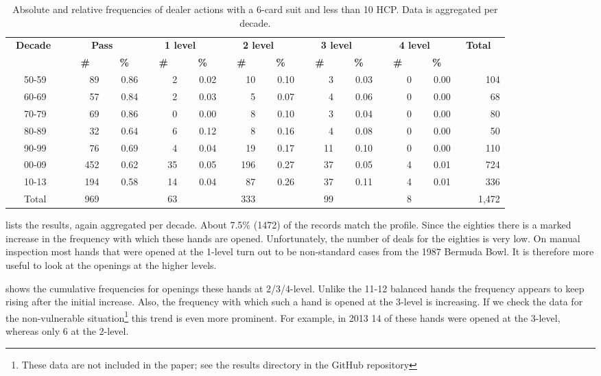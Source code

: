 \documentclass{llncs}
\begin{document}
\begin{table}
\caption{Absolute and relative frequencies of dealer actions with a
  6-card suit and less than 10 HCP. Data is aggregated per decade.}
\label{tbl:weak-two-1st}
\centering\footnotesize
\begin{tabular}{|c|r|r|r|r|r|r|r|r|r|r|r|}
\hline
\bf \ Decade \ & 
\multicolumn{2}{|c|}{\bf \ Pass \ }  &
\multicolumn{2}{|c|}{\bf \ 1 level \ } &
\multicolumn{2}{|c|}{\bf \ 2 level \ } &
\multicolumn{2}{|c|}{\bf \ 3 level \ } &
\multicolumn{2}{|c|}{\bf \ 4 level \ } &
\bf \ Total \  \\ 
\cline{2-11} &
\bf \ \ \# \ &\bf \ \ \% \ &
\bf \ \ \# \ &\bf \ \ \% \ &
\bf \ \ \# \ &\bf \ \ \% \ &
\bf \ \ \# \ &\bf \ \ \% \ &
\bf \ \ \# \ &\bf \ \ \% \ &
\\ \hline\hline
50-59& 89&0.86&2&0.02&10&0.10&3&0.03&0&0.00&104 \\ \hline
60-69& 57&0.84&2&0.03&5&0.07&4&0.06&0&0.00&68 \\ \hline
70-79& 69&0.86&0&0.00&8&0.10&3&0.04&0&0.00&80 \\ \hline
80-89& 32&0.64&6&0.12&8&0.16&4&0.08&0&0.00&50 \\ \hline
90-99&76&0.69&4&0.04&19&0.17&11&0.10&0&0.00&110\\ \hline
00-09&452&0.62&35&0.05&196&0.27&37&0.05&4&0.01&724 \\ \hline 
10-13&194&0.58&14&0.04&87&0.26&37&0.11&4&0.01& 336  \\ \hline
\hline
Total & 969 && 63 && 333 && 99 && 8 && 1,472 \\ \hline 	
\end{tabular}
\end{table}

 lists the results, again aggregated per decade.
About 7.5\% (1472) of the records match the profile. Since the
eighties there is a marked increase in the frequency with which these
hands are opened.  Unfortunately, the number of deals for the eighties
is very low. On manual inspection most hands that were opened at the
1-level turn out to be non-standard cases from the 1987 Bermuda Bowl.
It is therefore more useful to look at the openings at the higher
levels.


 shows the cumulative frequencies for openings
these hands at 2/3/4-level.  Unlike the 11-12 balanced hands the
frequency appears to keep rising after the initial increase.  Also,
the frequency with which such a hand is opened at the 3-level is
increasing. If we check the data for the non-vulnerable
situation\footnote{%
  These data are not included in the paper; see the results directory
  in the GitHub repository} this trend is even more prominent. For
example, in 2013 14 of these hands were opened at the 3-level, whereas
only 6 at the 2-level.
\end{document}
